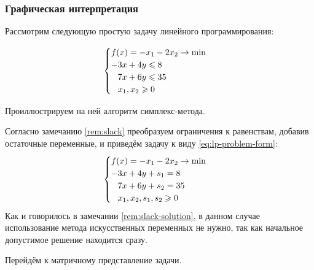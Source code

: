 \subsubsection{Графическая интерпретация}

Рассмотрим следующую простую задачу линейного программирования:

\begin{equation}
  \label{eq:lp-simple}
  \begin{cases}
    f(x) = -x_1-2x_2 \to \min \\
    -3x+4y \leq 8 \\
    \phm 7x+6y \leq 35 \\
    \phm x_1, x_2 \geq 0
  \end{cases}
\end{equation}

Проиллюстрируем на ней алгоритм симплекс-метода.

Согласно замечанию \ref{rem:slack} преобразуем ограничения к
равенствам, добавив остаточные переменные, и приведём задачу к виду
\eqref{eq:lp-problem-form}:
\begin{equation*}
  \begin{cases}
    f(x) = -x_1-2x_2 \to \min \\
    -3x+4y+s_1 = 8 \\
    \phm 7x+6y+s_2 = 35 \\
    \phm x_1, x_2, s_1, s_2 \geq 0
  \end{cases}
\end{equation*}
Как и говорилось в замечании \ref{rem:slack-solution}, в данном случае
использование метода искусственных переменных не нужно, так как
начальное допустимое решение находится сразу.

Перейдём к матричному представление задачи.

